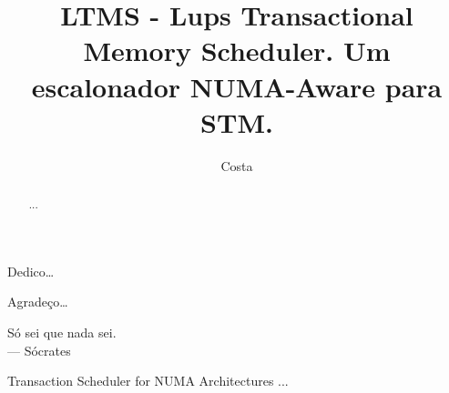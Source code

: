 \documentclass[diss,capa]{texufpel}
\title{LTMS - Lups Transactional Memory Scheduler. Um escalonador NUMA-Aware para STM.}
\author{Costa}{Michael Alexandre}
\begin{document}

\maketitle 

\sloppy

\fichacatalografica





\begin{dedicatoria}
  Dedico\ldots 
\end{dedicatoria}

\begin{agradecimentos}
  Agradeço\ldots 
\end{agradecimentos}

\begin{epigrafe}
  Só sei que nada sei.\\
  {\sc --- Sócrates}
\end{epigrafe}

\begin{abstract}
...
\end{abstract}

\begin{englishabstract}{Transaction Scheduler for NUMA Architectures}
...
\end{englishabstract}
\end{document}
